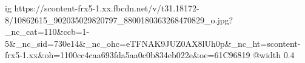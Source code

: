  
 
 
 
 

\ifcmt
  ig https://scontent-frx5-1.xx.fbcdn.net/v/t31.18172-8/10862615_902035029820797_8800180363268470829_o.jpg?_nc_cat=110&ccb=1-5&_nc_sid=730e14&_nc_ohc=eTFNAK9JUZ0AX8lUh0p&_nc_ht=scontent-frx5-1.xx&oh=1100cc4caa693fda5aa0c0b834eb022e&oe=61C96819
  @width 0.4
\fi
